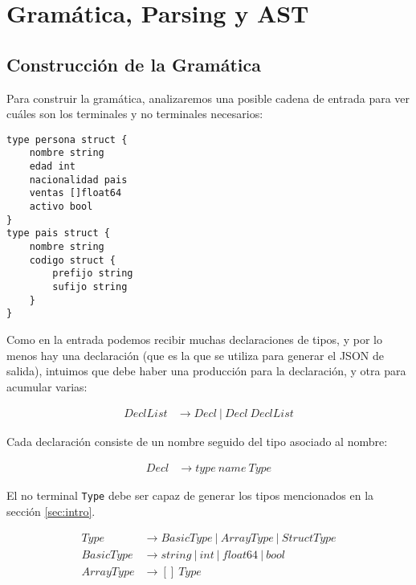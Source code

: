 \section{Gramática, Parsing y AST}
\label{sec:gramatica}

\subsection{Construcción de la Gramática}
Para construir la gramática, analizaremos una posible cadena de entrada para ver cuáles son los terminales y no terminales necesarios:

\begin{verbatim}
type persona struct {
    nombre string
    edad int
    nacionalidad pais
    ventas []float64
    activo bool
}
type pais struct {
    nombre string
    codigo struct {
        prefijo string
        sufijo string
    }
}
\end{verbatim}

Como en la entrada podemos recibir muchas declaraciones de tipos, y por lo menos hay una declaración (que es la que se utiliza para generar el JSON de salida), intuimos que debe haber una producción para la declaración, y otra para acumular varias:

\begin{equation}
\begin{split}
DeclList & \rightarrow Decl~|~Decl~DeclList 
\end{split}
\end{equation}

Cada declaración consiste de un nombre seguido del tipo asociado al nombre:

\begin{equation} \label{gram:decl}
\begin{split}
Decl & \rightarrow type~name~Type
\end{split}
\end{equation}

El no terminal \texttt{Type} debe ser capaz de generar los tipos mencionados en la sección \ref{sec:intro}. 

\begin{equation} \label{gram:type}
\begin{split}
Type & \rightarrow BasicType~|~ArrayType~|~StructType \\
BasicType & \rightarrow string~|~int~|~float64~|~bool \\
ArrayType & \rightarrow []~Type
\end{split}
\end{equation}

